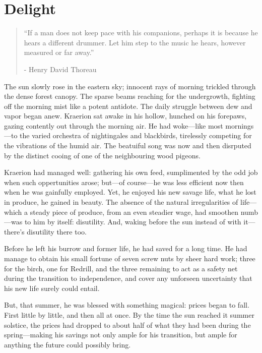 \chapter{Delight}

\vspace{-1.3cm}
\begin{localsize}{10}
	\begin{quote}
		“If a man does not keep pace with his companions, perhaps it is because he hears a different drummer. Let him step to the music he hears, however measured or far away.”
		\begin{flushright}- Henry David Thoreau \end{flushright}
	\end{quote} 
\end{localsize}
\vspace{1cm}

The sun slowly rose in the eastern sky; innocent rays of morning trickled through the dense forest canopy. The sparse beams reaching for the undergrowth, fighting off the morning mist like a potent antidote. The daily struggle between dew and vapor began anew. Kraerion sat awake in his hollow, hunched on his forepaws, gazing contently out through the morning air. He had woke---like most mornings---to the varied orchestra of nightingales and blackbirds, tirelessly competing for the vibrations of the humid air. The beatuiful song was now and then disrputed by the distinct cooing of one of the neighbouring wood pigeons.

Kraerion had managed well: gathering his own feed, sumplimented by the odd job when such oppertunities arose; but---of course---he was less efficient now then when he was gainfully employed. Yet, he enjoyed his new savage life, what he lost in produce, he gained in beauty. The absence of the natural irregularities of life---which a steady piece of produce, from an even steadier wage, had smoothen numb---was to him by itself: disutility. And, waking before the sun instead of with it---there's disutility there too.

Before he left his burrow and former life, he had saved for a long time. He had manage to obtain his small fortune of seven screw nuts by sheer hard work; three for the birch, one for Redrill, and the three remaining to act as a safety net during the transition to independence, and cover any unforseen  uncertainty that his new life surely could entail.

But, that summer, he was blessed with something magical: prices began to fall. First little by little, and then all at once. By the time the sun reached it summer solstice, the prices had dropped to about half of what they had been during the spring---making his savings not only ample for his transition, but ample for anything the future could possibly bring.

